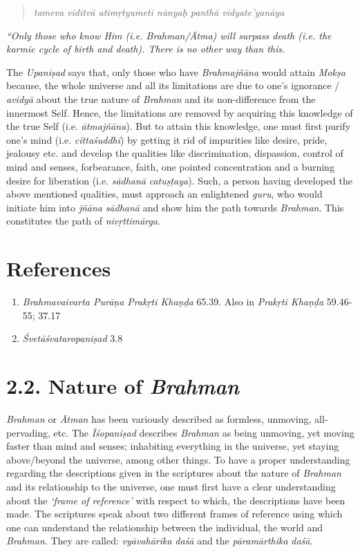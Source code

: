 \begin{verse}\emph{tameva viditvā atimṛtyumeti nānyaḥ panthā vidyate'yanāya }\end{verse}

\emph{``Only those who know Him (i.e. Brahman/Ātma) will surpass death (i.e. the karmic cycle of birth and death). There is no other way than this.}

The \emph{Upaniṣad} says that, only those who have \emph{Brahmajñāna} would attain \emph{Mokṣa} because, the whole universe and all its limitations are due to one's ignorance / \emph{avidyā} about the true nature of \emph{Brahman} and its non-difference from the innermost Self. Hence, the limitations are removed by acquiring this knowledge of the true Self (i.e. \emph{ātmajñāna}). But to attain this knowledge, one must first purify one's mind (i.e. \emph{cittaśuddhi}) by getting it rid of impurities like desire, pride, jealousy etc. and develop the qualities like discrimination, dispassion, control of mind and senses, forbearance, faith, one pointed concentration and a burning desire for liberation (i.e. \emph{sādhanā} \emph{catuṣṭaya}). Such, a person having developed the above mentioned qualities, must approach an enlightened \emph{guru}, who would initiate him into \emph{jñāna} \emph{sādhanā} and show him the path towards \emph{Brahman}. This constitutes the path of \emph{nivṛttimārga}.

\section*{References}

\begin{enumerate}
\itemsep=0pt
\item
  \emph{Brahmavaivarta Purāṇa Prakṛti Khaṇḍa} 65.39. Also in \emph{Prakṛti Khaṇḍa} 59.46-55; 37.17
\item
  \emph{Śvetāśvataropaniṣad} 3.8
\end{enumerate}

\section*{2.2. Nature of \emph{Brahman}}

\emph{Brahman} or \emph{Ātman} has been variously described as formless, unmoving, all-pervading, etc. The \emph{Īśopaniṣad} describes \emph{Brahman} as being unmoving, yet moving faster than mind and senses; inhabiting everything in the universe, yet staying above/beyond the universe, among other things. To have a proper understanding regarding the descriptions given in the scriptures about the nature of \emph{Brahman} and its relationship to the universe, one must first have a clear understanding about the \emph{`frame of reference'} with respect to which, the descriptions have been made. The scriptures speak about two different frames of reference using which one can understand the relationship between the individual, the world and \emph{Brahman}. They are called: \emph{vyāvahārika} \emph{daśā} and the \emph{pāramārthika} \emph{daśā}.

